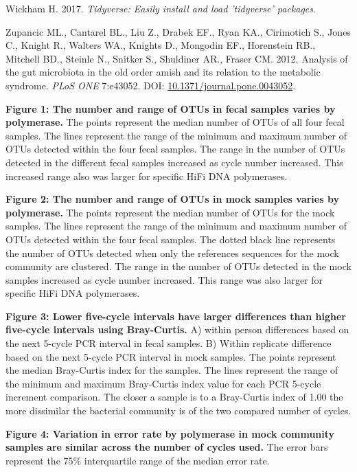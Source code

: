 \documentclass[11pt,]{article}
\begin{document}
\hypertarget{ref-tidyverse_2017}{}
Wickham H. 2017. \emph{Tidyverse: Easily install and load 'tidyverse'
packages}.

\hypertarget{ref-Zupancic2012}{}
Zupancic ML., Cantarel BL., Liu Z., Drabek EF., Ryan KA., Cirimotich S.,
Jones C., Knight R., Walters WA., Knights D., Mongodin EF., Horenstein
RB., Mitchell BD., Steinle N., Snitker S., Shuldiner AR., Fraser CM.
2012. Analysis of the gut microbiota in the old order amish and its
relation to the metabolic syndrome. \emph{PLoS ONE} 7:e43052. DOI:
\href{https://doi.org/10.1371/journal.pone.0043052}{10.1371/journal.pone.0043052}.

\newpage

\textbf{Figure 1: The number and range of OTUs in fecal samples varies
by polymerase.} The points represent the median number of OTUs of all
four fecal samples. The lines represent the range of the minimum and
maximum number of OTUs detected within the four fecal samples. The range
in the number of OTUs detected in the different fecal samples increased
as cycle number increased. This increased range also was larger for
specific HiFi DNA polymerases.

\textbf{Figure 2: The number and range of OTUs in mock samples varies by
polymerase.} The points represent the median number of OTUs for the mock
samples. The lines represent the range of the minimum and maximum number
of OTUs detected within the four fecal samples. The dotted black line
represents the number of OTUs detected when only the references
sequences for the mock community are clustered. The range in the number
of OTUs detected in the mock samples increased as cycle number
increased. This range was also larger for specific HiFi DNA polymerases.

\textbf{Figure 3: Lower five-cycle intervals have larger differences
than higher five-cycle intervals using Bray-Curtis.} A) within person
differences based on the next 5-cycle PCR interval in fecal samples. B)
Within replicate difference based on the next 5-cycle PCR interval in
mock samples. The points represent the median Bray-Curtis index for the
samples. The lines represent the range of the minimum and maximum
Bray-Curtis index value for each PCR 5-cycle increment comparison. The
closer a sample is to a Bray-Curtis index of 1.00 the more dissimilar
the bacterial community is of the two compared number of cycles.

\textbf{Figure 4: Variation in error rate by polymerase in mock
community samples are similar across the number of cycles used.} The
error bars represent the 75\% interquartile range of the median error
rate.
\end{document}
